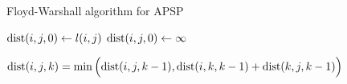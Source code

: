 
\begin{algorithm}[H]
  \caption{Floyd-Warshall algorithm for APSP}
  \label{alg:floyd-warshall}
  \begin{algorithmic}
	\State $\text{dist}(i,j,0) \gets l(i,j)$
      \Else
        \State $\text{dist}(i,j,0) \gets \infty$
      \EndIf
    \EndFor

    \Statex
	  \State $\text{dist}(i,j,k) = \min\Big(\text{dist}(i,j,k-1), \text{dist}(i,k,k-1) + \text{dist}(k,j,k-1)\Big)$
	\EndFor
      \EndFor
    \EndFor
  \end{algorithmic}
\end{algorithm}
